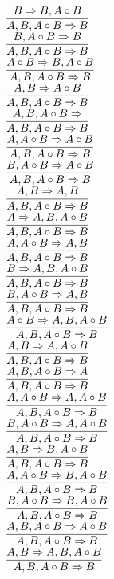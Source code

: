 \documentclass[11pt]{article}
\begin{document}
\begin{center}
\bigskip
\\$\infer{A, B, A\circ B\Rightarrow B}{B\Rightarrow B, A\circ B}$
\bigskip
\\$\infer{A, B, A\circ B\Rightarrow B}{B, A\circ B\Rightarrow B}$
\bigskip
\\$\infer{A, B, A\circ B\Rightarrow B}{A\circ B\Rightarrow B, A\circ B}$
\bigskip
\\$\infer{A, B, A\circ B\Rightarrow B}{A, B\Rightarrow A\circ B}$
\bigskip
\\$\infer{A, B, A\circ B\Rightarrow B}{A, B, A\circ B\Rightarrow }$
\bigskip
\\$\infer{A, B, A\circ B\Rightarrow B}{A, A\circ B\Rightarrow A\circ B}$
\bigskip
\\$\infer{A, B, A\circ B\Rightarrow B}{B, A\circ B\Rightarrow A\circ B}$
\bigskip
\\$\infer{A, B, A\circ B\Rightarrow B}{A, B\Rightarrow A, B}$
\bigskip
\\$\infer{A, B, A\circ B\Rightarrow B}{A\Rightarrow A, B, A\circ B}$
\bigskip
\\$\infer{A, B, A\circ B\Rightarrow B}{A, A\circ B\Rightarrow A, B}$
\bigskip
\\$\infer{A, B, A\circ B\Rightarrow B}{B\Rightarrow A, B, A\circ B}$
\bigskip
\\$\infer{A, B, A\circ B\Rightarrow B}{B, A\circ B\Rightarrow A, B}$
\bigskip
\\$\infer{A, B, A\circ B\Rightarrow B}{A\circ B\Rightarrow A, B, A\circ B}$
\bigskip
\\$\infer{A, B, A\circ B\Rightarrow B}{A, B\Rightarrow A, A\circ B}$
\bigskip
\\$\infer{A, B, A\circ B\Rightarrow B}{A, B, A\circ B\Rightarrow A}$
\bigskip
\\$\infer{A, B, A\circ B\Rightarrow B}{A, A\circ B\Rightarrow A, A\circ B}$
\bigskip
\\$\infer{A, B, A\circ B\Rightarrow B}{B, A\circ B\Rightarrow A, A\circ B}$
\bigskip
\\$\infer{A, B, A\circ B\Rightarrow B}{A, B\Rightarrow B, A\circ B}$
\bigskip
\\$\infer{A, B, A\circ B\Rightarrow B}{A, A\circ B\Rightarrow B, A\circ B}$
\bigskip
\\$\infer{A, B, A\circ B\Rightarrow B}{B, A\circ B\Rightarrow B, A\circ B}$
\bigskip
\\$\infer{A, B, A\circ B\Rightarrow B}{A, B, A\circ B\Rightarrow A\circ B}$
\bigskip
\\$\infer{A, B, A\circ B\Rightarrow B}{A, B\Rightarrow A, B, A\circ B}$

\end{center}
\end{document}
